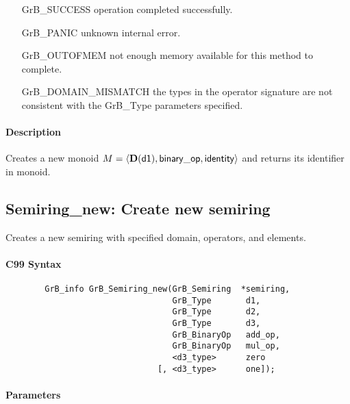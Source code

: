 \begin{itemize}[leftmargin=2.1in]
\item[{\sf GrB\_SUCCESS}]           operation completed successfully.
\item[{\sf GrB\_PANIC}]             unknown internal error.
\item[{\sf GrB\_OUTOFMEM}]          not enough memory available for this method to complete.
\item[{\sf GrB\_DOMAIN\_MISMATCH}]  the types in the operator signature are not   
                                    consistent with the {\sf GrB\_Type} parameters specified.
\end{itemize}

\paragraph{Description}

Creates a new monoid $M = \langle \bold{D}({\sf d1}), 
{\sf binary\_op}, {\sf identity} \rangle$ and
returns its identifier in {\sf monoid}.


\subsection{{\sf Semiring\_new}: Create new semiring}

Creates a new semiring with specified domain, operators, and elements.

\paragraph{C99 Syntax}

\begin{verbatim}
        GrB_info GrB_Semiring_new(GrB_Semiring  *semiring,
                                  GrB_Type       d1,
                                  GrB_Type       d2,
                                  GrB_Type       d3,
                                  GrB_BinaryOp   add_op,
                                  GrB_BinaryOp   mul_op,
                                  <d3_type>      zero
                               [, <d3_type>      one]);
\end{verbatim}

\paragraph{Parameters}

